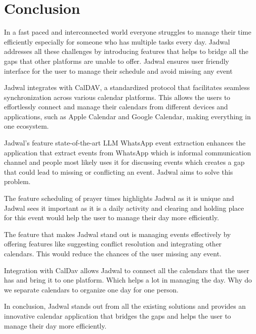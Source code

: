 \documentclass[12pt,a4paper]{report}
\begin{document}
\chapter*{Conclusion}

In a fast paced and interconnected world everyone struggles to manage their time efficiently especially for someone who has multiple tasks every day. Jadwal addresses all these challenges by introducing features that helps to bridge all the gaps that other platforms are unable to offer. Jadwal ensures user friendly interface for the user to manage their schedule and avoid missing any event

Jadwal integrates with CalDAV, a standardized protocol that facilitates seamless synchronization across various calendar platforms. This allows the users to effortlessly connect and manage their calendars from different devices and applications, such as Apple Calendar and Google Calendar, making everything in one ecosystem. 

Jadwal's feature state-of-the-art LLM WhatsApp event extraction enhances the application that extract events from WhatsApp which is informal communication channel and people most likely uses it for discussing events which creates a gap that could lead to missing or conflicting an event. Jadwal aims to solve this problem.

The feature scheduling of prayer times highlights Jadwal as it is unique and Jadwal sees it important as it is a daily activity and clearing and holding place for this event would help the user to manage their day more efficiently.

The feature that makes Jadwal stand out is managing events effectively by offering features like suggesting conflict resolution and integrating other calendars. This would reduce the chances of the user missing any event.

Integration with CalDav allows Jadwal to connect all the calendars that the user has and bring it to one platform. Which helps a lot in managing the day. Why do we separate calendars to organize one day for one person. 

In conclusion, Jadwal stands out from all the existing solutions and provides an innovative calendar application that bridges the gaps and helps the user to manage their day more efficiently.




\end{document}
